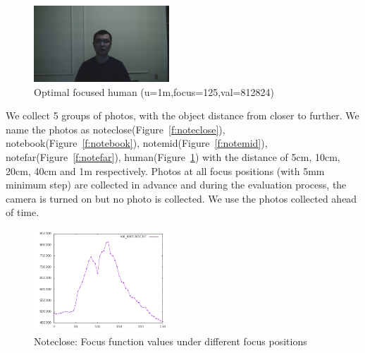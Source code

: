 \begin{figure}[tb!]
	\begin{center}
		\includegraphics[width=2in]{human}
	\end{center}
	\caption{Optimal focused human (u=1m,focus=125,val=812824)}
	\label{f:human}
\end{figure}

We collect 5 groups of photos, with the object distance from closer to further.
We name the photos as noteclose(Figure~\ref{f:noteclose}), notebook(Figure~\ref{f:notebook}), notemid(Figure~\ref{f:notemid}), notefar(Figure~\ref{f:notefar}), human(Figure~\ref{f:human}) with the distance of 5cm, 10cm, 20cm, 40cm and 1m respectively.
Photos at all focus positions (with 5mm minimum step) are collected in advance and during the evaluation process, the camera is turned on but no photo is collected.
We use the photos collected ahead of time.

\begin{figure}[tb!]
	\begin{center}
		\includegraphics[width=2in]{notecloseplot}
	\end{center}
	\caption{Noteclose: Focus function values under different focus positions}
	\label{f:notecloseplot}
\end{figure}

